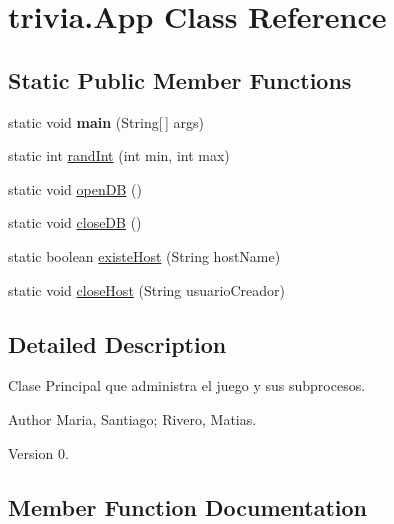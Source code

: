 \hypertarget{classtrivia_1_1App}{}\section{trivia.\+App Class Reference}
\label{classtrivia_1_1App}
\subsection*{Static Public Member Functions}
\begin{DoxyCompactItemize}
\item 
\mbox{\label{classtrivia_1_1App_ad2da3a023757541d9eecc0a10a213168}} 
static void {\bfseries main} (String\mbox{[}$\,$\mbox{]} args)
\item 
static int \mbox{\hyperlink{classtrivia_1_1App_adcedb003b5a5fa73689c3d7a276f9530}{rand\+Int}} (int min, int max)
\item 
static void \mbox{\hyperlink{classtrivia_1_1App_a626312af5afd16555429d2241273d85d}{open\+DB}} ()
\item 
static void \mbox{\hyperlink{classtrivia_1_1App_a32815da15f55607f228ee3a431c98e46}{close\+DB}} ()
\item 
static boolean \mbox{\hyperlink{classtrivia_1_1App_a0ba549b8577987ac6565b91ad65d6cce}{existe\+Host}} (String host\+Name)
\item 
static void \mbox{\hyperlink{classtrivia_1_1App_a4753bc6610d49e0d101c01d00b4b99d6}{close\+Host}} (String usuario\+Creador)
\end{DoxyCompactItemize}


\subsection{Detailed Description}
Clase Principal que administra el juego y sus subprocesos. \begin{DoxyAuthor}{Author}
Maria, Santiago; Rivero, Matias. 
\end{DoxyAuthor}
\begin{DoxyVersion}{Version}
0. 
\end{DoxyVersion}


\subsection{Member Function Documentation}
\mbox{\label{classtrivia_1_1App_a32815da15f55607f228ee3a431c98e46}} 
